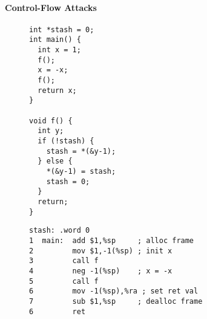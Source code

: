\documentclass[10pt,conference]{ieeetran}%
\theoremstyle{definition}
\begin{document}
\paragraph*{Control-Flow Attacks}
\begin{figure*}
  \centering
\hspace*{-6em}
  \begin{subfigure}[t]{.2\textwidth}
{\footnotesize
\begin{lstlisting}
int *stash = 0;
int main() {
  int x = 1;
  f();
  x = -x;
  f();
  return x;
}

void f() {
  int y;
  if (!stash) {
    stash = *(&y-1);
  } else {
    *(&y-1) = stash;
    stash = 0;
  }
  return;
}
\end{lstlisting}
}
\end{subfigure}
  \begin{subfigure}[t]{.4\textwidth}
{\footnotesize
\begin{lstlisting}[backgroundcolor=\color{lgray}]
   stash: .word 0
1  main:  add $1,%sp     ; alloc frame
2         mov $1,-1(%sp) ; init x
3         call f
4         neg -1(%sp)    ; x = -x
5         call f
6         mov -1(%sp),%ra ; set ret val
7         sub $1,%sp     ; dealloc frame
6         ret


\end{lstlisting}}
\end{subfigure}
\end{figure*}
\end{document}
